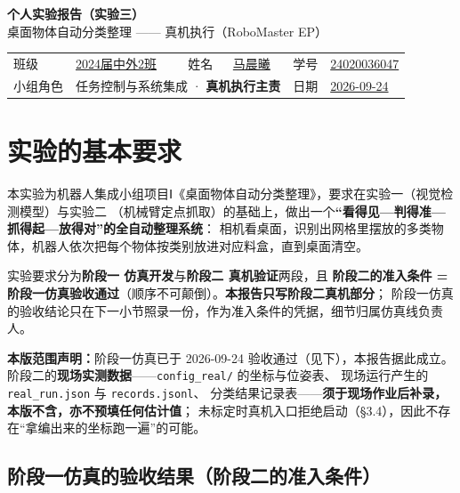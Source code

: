 \documentclass[12pt,a4paper]{ctexart}
\begin{document}
\begin{center}
  {\LARGE\bfseries 个人实验报告（实验三）}\\[6pt]
  {\Large 桌面物体自动分类整理 —— 真机执行（RoboMaster EP）}
\end{center}

\begin{center}
\renewcommand{\arraystretch}{1.35}
\begin{tabular}{@{}l p{3.5cm} l p{3.5cm} l p{3.5cm}@{}}
  班级 & \underline{2024届中外2班} & 姓名 & \underline{马晨曦} & 学号 & \underline{24020036047} \\
  小组角色 & \multicolumn{3}{l}{任务控制与系统集成 · \textbf{真机执行主责}} & 日期 & \underline{2026-09-24} \\
\end{tabular}
\end{center}

\section{实验的基本要求}

本实验为机器人集成小组项目Ⅰ《桌面物体自动分类整理》，要求在实验一（视觉检测模型）与实验二
（机械臂定点抓取）的基础上，做出一个\textbf{“看得见—判得准—抓得起—放得对”的全自动整理系统}：
相机看桌面，识别出网格里摆放的多类物体，机器人依次把每个物体按类别放进对应料盒，直到桌面清空。

实验要求分为\textbf{阶段一 仿真开发}与\textbf{阶段二 真机验证}两段，且
\textbf{阶段二的准入条件 = 阶段一仿真验收通过}（顺序不可颠倒）。\textbf{本报告只写阶段二真机部分}；
阶段一仿真的验收结论只在下一小节照录一份，作为准入条件的凭据，细节归属仿真线负责人。

\textbf{本版范围声明：}阶段一仿真已于 2026-09-24 验收通过（见下），本报告据此成立。
阶段二的\textbf{现场实测数据}——\texttt{config\_real/} 的坐标与位姿表、
现场运行产生的 \texttt{real\_run.json} 与 \texttt{records.jsonl}、
分类结果记录表——\textbf{须于现场作业后补录，本版不含，亦不预填任何估计值}；
未标定时真机入口拒绝启动（§3.4），因此不存在“拿编出来的坐标跑一遍”的可能。

\subsection*{阶段一仿真的验收结果（阶段二的准入条件）}
\end{document}
